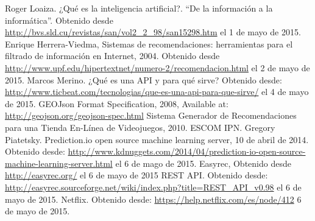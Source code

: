 \begin{thebibliography}{1}

    Roger Loaiza. ¿Qué es la inteligencia artificial?. “De la información a la informática”. Obtenido desde \url{http://bvs.sld.cu/revistas/san/vol2_2_98/san15298.htm} el 1 de mayo de 2015.
    Enrique Herrera-Viedma, Sistemas de recomendaciones: herramientas para el filtrado de información en Internet, 2004. Obtenido desde \url{http://www.upf.edu/hipertextnet/numero-2/recomendacion.html} el 2 de mayo de 2015. 
     Marcos Merino. ¿Qué es una API y para qué sirve? Obtenido desde: \url{http://www.ticbeat.com/tecnologias/que-es-una-api-para-que-sirve/} el 4 de mayo de 2015. 
     GEOJson Format Specification, 2008, Available at: \url{http://geojson.org/geojson-spec.html}
     Sistema Generador de Recomendaciones para una Tienda En-Línea de Videojuegos, 2010. ESCOM IPN. 
    Gregory Piatetsky. Prediction.io open source machine learning server, 10 de abril de 2014. Obtenido desde: \url{http://www.kdnuggets.com/2014/04/prediction-io-open-source-machine-learning-server.html} el 6 de mago de 2015. 
    Easyrec, Obtenido desde \url{http://easyrec.org/} el 6 de mayo de 2015 
    REST API. Obtenido desde: \url{http://easyrec.sourceforge.net/wiki/index.php?title=REST_API_v0.98} el 6 de mayo de 2015. 
    Netflix. Obtenido desde: \url{https://help.netflix.com/es/node/412} 6 de mayo de 2015.

\end{thebibliography}
